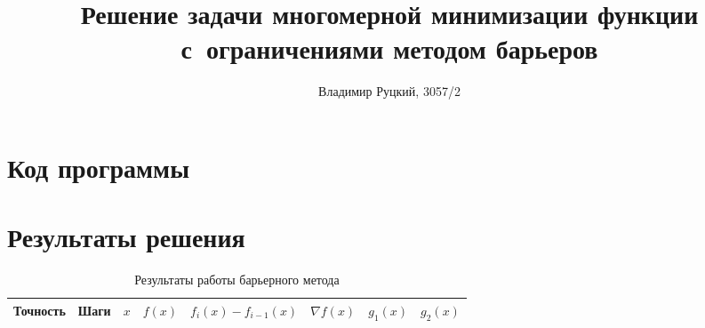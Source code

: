 \documentclass[10pt,a4paper,titlepage]{article}
\title{Решение задачи многомерной минимизации функции с~ограничениями методом барьеров}
\author{Владимир Руцкий, 3057/2}
\date{} %
\begin{document}
\maketitle
\thispagestyle{empty}

\section*{Код программы}
\lstset{language=C++, caption=Барьерный метод,%
label=bm-source-code, basicstyle=\footnotesize,%
numbers=left, numberstyle=\footnotesize, numbersep=5pt, frame=single, breaklines=true, breakatwhitespace=false,%
inputencoding=utf8x}


\section*{Результаты решения}


\begin{landscape}
\begin{table}[H]
\caption{Результаты работы барьерного метода}
\label{bm-result-table}
\begin{center}
\begin{tabular}{|c|c|c|c|c|c|c|c|}
\hline
Точность & Шаги & $x$ & $f(x)$ & $f_i(x) - f_{i - 1}(x)$ & $\nabla f(x)$ & $g_1(x)$ &  $g_2(x)$ \\
\hline
\hline
\end{tabular}
\end{center}
\end{table}
\end{landscape}

\end{document}
